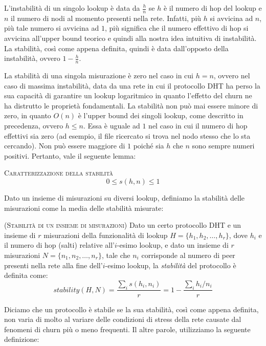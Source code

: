 \documentclass[prodmode,acmtap]{acmlarge}
\begin{document}
L'instabilità di un singolo lookup è data da $\frac{h}{n}$ se $h$ è il numero di hop del lookup e $n$ il numero di nodi al momento presenti nella rete. Infatti, più $h$ si avvicina ad $n$, più tale numero si avvicina ad $1$, più significa che il numero effettivo di hop si avvicina all'upper bound teorico e quindi alla nostra idea intuitiva di instabilità. La stabilità, così come appena definita, quindi è data dall'opposto della instabilità, ovvero $1 - \frac{h}{n}$.

La stabilità di una singola misurazione è zero nel caso in cui $h=n$, ovvero nel caso di massima instabilità, data da una rete in cui il protocollo DHT ha perso la sua capacità di garantire un lookup logaritmico in quanto l'effetto del churn ne ha distrutto le proprietà fondamentali. La stabilità non può mai essere minore di zero, in quanto $O(n)$ è l'upper bound dei singoli lookup, come descritto in precedenza, ovvero $h \leq n$. Essa è uguale ad $1$ nel caso in cui il numero di hop effettivi sia zero (ad esempio, il file ricercato si trova nel nodo stesso che lo sta cercando). Non può essere maggiore di $1$ poiché sia $h$ che $n$ sono sempre numeri positivi. Pertanto, vale il seguente lemma:

\begin{lemma}{\textsc{Caratterizzazione della stabilità}}
$$ 0 \leq s(h,n) \leq 1 $$
\end{lemma}

Dato un insieme di misurazioni su diversi lookup, definiamo la stabilità delle misurazioni come la media delle stabilità misurate:

\begin{definition}{(\textsc{Stabilità di un insieme di misurazioni})}
Dato un certo protocollo DHT e un insieme di $r$ misurazioni della funzionalità di lookup ${H=\{ h_1, h_2, \dots, h_r \}}$, dove $h_i$ e il numero di hop (salti) relative all'$i$-esimo lookup, e dato un insieme di $r$ misurazioni ${N=\{ n_1, n_2, \dots, n_r \}}$, tale che $n_i$ corrisponde al numero di peer presenti nella rete alla fine dell'$i$-esimo lookup, la \emph{stabilità} del protocollo è definita come:
$$ stability(H,N) = \frac{\sum_{i} s(h_i,n_i)}{r}  = 1 - \frac{\sum_{i}^{}h_i/n_i}{r} $$
\end{definition}

Diciamo che un protocollo è stabile se la sua stabilità, così come appena definita, non varia di molto al variare delle condizioni di stress della rete causate dal fenomeni di churn più o meno frequenti. Il altre parole, utilizziamo la seguente definizione:
\end{document}
